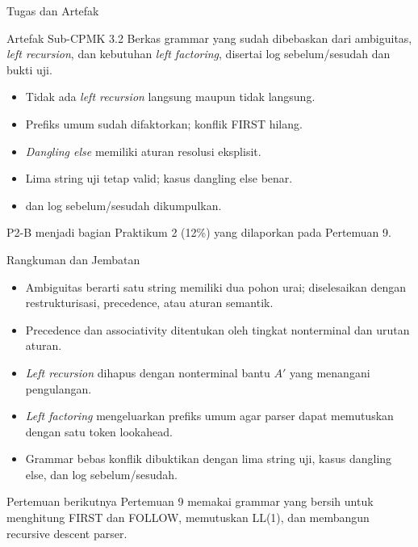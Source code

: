 \documentclass[aspectratio=169,10pt,t]{beamer}
\begin{document}
\begin{frame}{Tugas dan Artefak}
  \begin{block}{Artefak Sub-CPMK 3.2}
    Berkas grammar yang sudah dibebaskan dari ambiguitas,
    \textit{left recursion}, dan kebutuhan \textit{left factoring},
    disertai log sebelum/sesudah dan bukti uji.
  \end{block}

  \small
  \begin{itemize}
    \item Tidak ada \textit{left recursion} langsung maupun tidak
          langsung.
    \item Prefiks umum sudah difaktorkan; konflik FIRST hilang.
    \item \textit{Dangling else} memiliki aturan resolusi eksplisit.
    \item Lima string uji tetap valid; kasus dangling else benar.
    \item {} dan log sebelum/sesudah dikumpulkan.
  \end{itemize}

  \vspace{3pt}
  {\footnotesize\color{ubbblue!75}P2-B menjadi bagian Praktikum 2
  (12\%) yang dilaporkan pada Pertemuan 9.}
\end{frame}

\begin{frame}{Rangkuman dan Jembatan}
  \begin{itemize}
    \item Ambiguitas berarti satu string memiliki dua pohon urai;
          diselesaikan dengan restrukturisasi, precedence, atau aturan
          semantik.
    \item Precedence dan associativity ditentukan oleh tingkat
          nonterminal dan urutan aturan.
    \item \textit{Left recursion} dihapus dengan nonterminal bantu
          \(A'\) yang menangani pengulangan.
    \item \textit{Left factoring} mengeluarkan prefiks umum agar parser
          dapat memutuskan dengan satu token lookahead.
    \item Grammar bebas konflik dibuktikan dengan lima string uji,
          kasus dangling else, dan log sebelum/sesudah.
  \end{itemize}

  \vspace{4pt}
  \begin{exampleblock}{Pertemuan berikutnya}
    Pertemuan 9 memakai grammar yang bersih untuk menghitung FIRST dan
    FOLLOW, memutuskan LL(1), dan membangun recursive descent parser.
  \end{exampleblock}
\end{frame}
\end{document}
